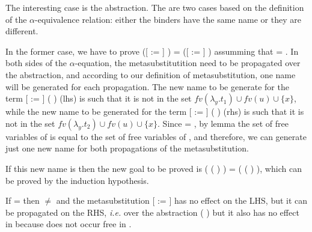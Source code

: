 The interesting case is the abstraction. The are two cases based on the definition of the $\alpha$-equivalence relation: either the binders have the same name or they are different. 
\begin{coqdoccode}
\end{coqdoccode}
In the former case, we have to prove  ([ := ]   ) = ([ := ]   ) assumming that  = . In both sides of the $\alpha$-equation, the metasubstitutition need to be propagated over the abstraction, and according to our definition of metasubstitution, one name will be generated for each propagation. The new name to be generate for the term [ := ] (  ) (lhs) is such that it is not in the set $fv(\lambda_y.t_1)\cup fv(u) \cup \{x\}$, while the new name to be generated for the term [ := ] (  ) (rhs) is such that it is not in the set $fv(\lambda_y.t_2)\cup fv(u) \cup \{x\}$. Since  = , by lemma  the set of free variables of  is equal to the set of free variables of , and therefore, we can generate just one new name for both propagations of the metasubstitution. 
\begin{coqdoccode}
\end{coqdoccode}
If this new name is  then the new goal to be proved is   ( (   )  ) =   ( (   )  ), which can be proved by the induction hypothesis. 
\begin{coqdoccode}
\end{coqdoccode}
If  =  then  \ensuremath{\not=}  and the metasubstitution [ := ] has no effect on the LHS, but it can be propagated on the RHS, {\it i.e.} over the abstraction (  ) but it also has no effect in  because  does not occur free in . 
\begin{coqdoccode}
\end{coqdoccode}
